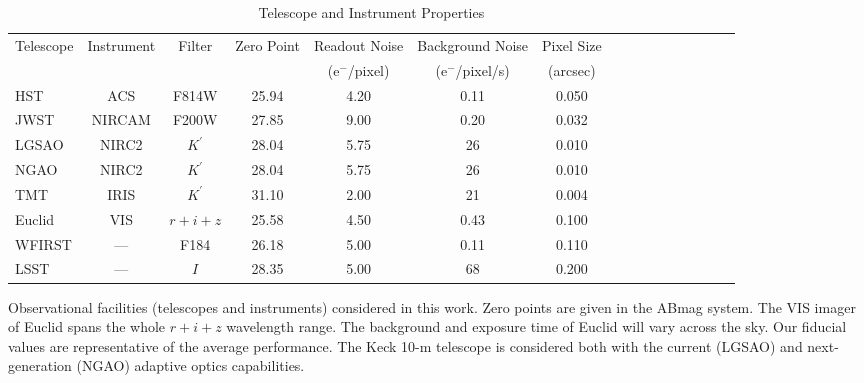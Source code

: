 \documentclass[a4paper,11pt]{article}
\begin{document}
\clearpage
\begin{table}\footnotesize
\begin{center}
\caption{Telescope and Instrument Properties}
\begin{tabular}{lccccccccccccccc|}
\hline \hline
Telescope & Instrument & Filter & Zero Point & Readout Noise & Background Noise & Pixel Size \\
 & & & & (e$^-$/pixel) & (e$^-$/pixel/s) & (arcsec) \\
\hline
  HST    & ACS    &   F814W     &  25.94  & 4.20   &    0.11    &     0.050    \\
  JWST   & NIRCAM &   F200W     &  27.85  & 9.00   &    0.20    &     0.032  \\
  LGSAO  & NIRC2  &   $K^\prime$&  28.04  & 5.75   &      26    &     0.010      \\
  NGAO   & NIRC2  &   $K^\prime$&  28.04  & 5.75   &      26    &     0.010     \\
  TMT    & IRIS   &   $K^\prime$&  31.10  & 2.00   &      21    &     0.004  \\
  Euclid & VIS    &   $r+i+z$   &  25.58  & 4.50   &    0.43    &     0.100   \\
  WFIRST & ---    &   F184      &  26.18  & 5.00   &    0.11    &     0.110   \\
  LSST   & ---    &   $I$       &  28.35  & 5.00   &      68    &     0.200  \\
\hline
\hline
\end{tabular}
\begin{tablenotes}
\item
Observational facilities (telescopes and instruments) considered in this work.
 Zero points are given in the ABmag system. The VIS imager of Euclid spans the whole $r+i+z$ wavelength range. The background and exposure time of Euclid will vary across the sky. Our fiducial values are representative of the average performance. The Keck 10-m telescope is considered both with the current (LGSAO) and next-generation (NGAO) adaptive optics capabilities.\\
\end{tablenotes}
\label{tab:telescopes parameters}
\end{center}
\end{table}
\end{document}
